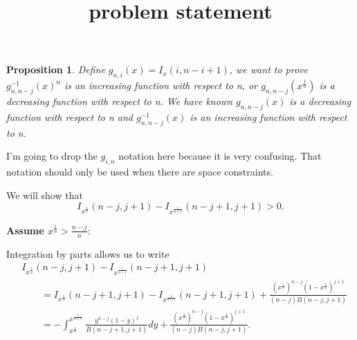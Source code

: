 \documentclass[12pt]{article}
\date{}
\title{problem statement}
\newcommand{\xn}{x^{\frac{1}{n}}}
\newcommand{\xnone}{x^{\frac{1}{n+1}}}
\newtheorem{prop}[theorem]{Proposition}
\begin{document}
\maketitle

\begin{prop}
	Define $g_{n,i}(x) = I_x(i, n-i+1)$, we want to prove $g^{-1}_{n, n-j}(x)^n$ is an increasing function with respect to n, or $g_{n, n-j}(x^{\frac{1}{n}})$ is a decreasing function with respect to n. We have known $g_{n,n-j}(x)$ is a decreasing function with respect to n and $g^{-1}_{n,n-j}(x)$ is an increasing function with respect to n. 
\end{prop}

I'm going to drop the $g_{i,n}$ notation here because it is very confusing. That notation should only be used when there are space constraints.

\vspace{12pt}

We will show that 
$$
  I_{\xn}(n-j, j+1) - I_{\xnone}(n-j+1, j+1) > 0.
$$

\vspace{12pt}

\noindent\textbf{Assume $\xn > \frac{n-j}{n}$}:

\vspace{12pt}

Integration by parts allows us to write
\begin{align*}
&I_{\xn}(n-j, j+1) - I_{\xnone}(n-j+1, j+1) \\ 
  &\qquad= I_{\xn}(n-j+1, j+1) - I_{\xnone}(n-j+1, j+1) + \frac{\left(\xn\right)^{n-j}\left(1-\xn\right)^{j+1}}{(n-j)B(n-j,j+1)} \\
  &\qquad= -\int_{\xn}^{\xnone} \frac{y^{n-j}(1 - y)^{j}}{B(n-j+1,j+1)} dy 
  	+ \frac{\left(\xn\right)^{n-j}\left(1-\xn\right)^{j+1}}{(n-j)B(n-j,j+1)}.
\end{align*}
\end{document}
